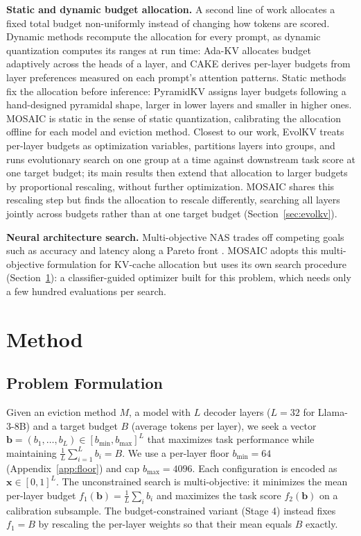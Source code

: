 \documentclass[11pt]{article}
\begin{document}
\textbf{Static and dynamic budget allocation.} A second line of work allocates a fixed total budget non-uniformly instead of changing how tokens are scored. Dynamic methods recompute the allocation for every prompt, as dynamic quantization computes its ranges at run time: Ada-KV \citep{feng2025adakv} allocates budget adaptively across the heads of a layer, and CAKE \citep{qin2025cake} derives per-layer budgets from layer preferences measured on each prompt's attention patterns. Static methods fix the allocation before inference: PyramidKV \citep{cai2025pyramidkv} assigns layer budgets following a hand-designed pyramidal shape, larger in lower layers and smaller in higher ones. MOSAIC is static in the sense of static quantization, calibrating the allocation offline for each model and eviction method. Closest to our work, EvolKV \citep{yu2025evolkv} treats per-layer budgets as optimization variables, partitions layers into groups, and runs evolutionary search on one group at a time against downstream task score at one target budget; its main results then extend that allocation to larger budgets by proportional rescaling, without further optimization. MOSAIC shares this rescaling step but finds the allocation to rescale differently, searching all layers jointly across budgets rather than at one target budget (Section~\ref{sec:evolkv}).

\textbf{Neural architecture search.} Multi-objective NAS trades off competing goals such as accuracy and latency along a Pareto front \citep{elsken2018neural}. MOSAIC adopts this multi-objective formulation for KV-cache allocation but uses its own search procedure (Section~\ref{sec:method}): a classifier-guided optimizer built for this problem, which needs only a few hundred evaluations per search.

\section{Method}
\label{sec:method}

\subsection{Problem Formulation}
\label{sec:formulation}

Given an eviction method $M$, a model with $L$ decoder layers ($L = 32$ for Llama-3-8B) and a target budget $B$ (average tokens per layer), we seek a vector $\mathbf{b} = (b_1, \ldots, b_L) \in [b_{\min}, b_{\max}]^L$ that maximizes task performance while maintaining $\frac{1}{L}\sum_{i=1}^{L} b_i = B$. We use a per-layer floor $b_{\min} = 64$ (Appendix~\ref{app:floor}) and cap $b_{\max} = 4096$. Each configuration is encoded as $\mathbf{x} \in [0,1]^L$. The unconstrained search is multi-objective: it minimizes the mean per-layer budget $f_1(\mathbf{b}) = \frac{1}{L}\sum_i b_i$ and maximizes the task score $f_2(\mathbf{b})$ on a calibration subsample. The budget-constrained variant (Stage 4) instead fixes $f_1 = B$ by rescaling the per-layer weights so that their mean equals $B$ exactly.
\end{document}
